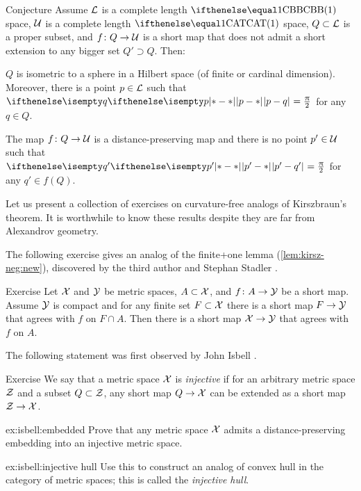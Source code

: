 \begin{thm}{Conjecture}\label{conj:kirsz}
Assume $\mathcal{L}$ is a complete length $\Alex1$ space,
$\mathcal{U}$ is a complete length $\CAT1$ space,
$Q\subset \spc{L}$ is a proper subset,
and $f\: Q\to\spc{U}$ is a short map that does not admit a short extension to any bigger set $Q'\supset Q$. 
Then: 

\begin{subthm}{}
$Q$ is isometric to a sphere in a Hilbert space (of finite or cardinal dimension).
Moreover, there is a point $p\in \spc{L}$ such that $\dist{p}{q}{}=\tfrac{\pi}{2}$ for any $q\in Q$.
\end{subthm}

\begin{subthm}{}
The map $f\:Q\to\spc{U}$ is a distance-preserving map and there is no point $p'\in \spc{U}$ such that $\dist{p'}{q'}{}=\tfrac{\pi}{2}$ for any $q'\in f(Q)$.
\end{subthm}
\end{thm}

Let us present a collection of exercises on curvature-free analogs of Kirszbraun's theorem.
It is worthwhile to know these results despite they are far from Alexandrov geometry.

The following exercise gives an analog of the finite+one lemma (\ref{lem:kirsz-neg:new}),  discovered by the third author and Stephan Stadler \cite{perunin-stadler}.

\begin{thm}{Exercise}\label{ex:perunin-stadler}
Let $\mathcal{X}$ and $\mathcal{Y}$ be metric spaces, $A\subset \spc{X}$, and $f\:A\to \spc{Y}$ be a short map.
Assume $\mathcal{Y}$ is compact and for any finite set $F\subset \spc{X}$ there is a short map $F\to \spc{Y}$ that agrees with $f$ on $F\cap A$.
Then there is a short map $\spc{X}\to \spc{Y}$ that agrees with $f$ on $A$.
\end{thm}

The following statement was first observed by John Isbell \cite{isbell}.

\begin{thm}{Exercise}\label{ex:isbell}
We say that a metric space $\mathcal{X}$ is  \emph{injective} 
if for an arbitrary metric space $\mathcal{Z}$ 
and a subset $Q\subset\spc Z$, 
any short map $Q\to\spc{X}$ can be extended as a short map $\spc{Z}\to\spc{X}$.
\begin{subthm}{ex:isbell:embedded}
Prove that any metric space $\mathcal{X}$ admits a distance-preserving embedding into an injective metric space.
\end{subthm}

\begin{subthm}{ex:isbell:injective hull}
Use this to construct an analog of convex hull in the category of metric spaces; this is called the \emph{injective hull}.
\end{subthm}
\end{thm}



